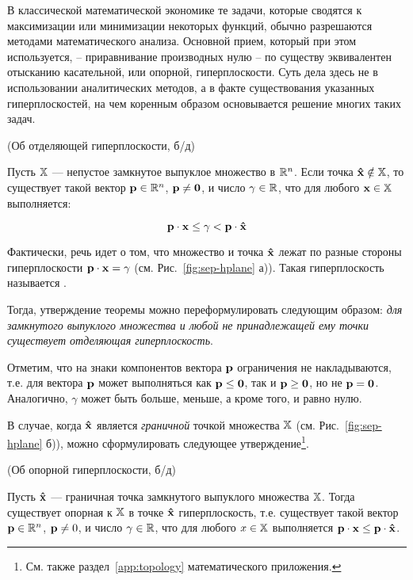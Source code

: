 В классической математической экономике те задачи, которые сводятся
к максимизации или минимизации некоторых функций, обычно разрешаются
методами математического анализа. Основной прием, который при этом
используется, -- приравнивание производных нулю -- по существу
эквивалентен отысканию касательной, или опорной, гиперплоскости.
Суть дела здесь не в использовании аналитических методов, а в факте
существования указанных гиперплоскостей, на чем коренным образом
основывается решение многих таких задач.


\begin{teo}(Об отделяющей гиперплоскости, б/д)
\label{teo:sep-hplane}

Пусть $\mathbb{X}$ --- непустое замкнутое выпуклое множество в $\mathbb{R}^n$.
Если точка $\mathbf{\hat x} \notin \mathbb{X}$, то существует такой вектор
$\mathbf{p} \in \mathbb{R}^n$, $\mathbf{p} \neq \mathbf{0}$, и число $\gamma \in \mathbb{R}$,
что для любого $\mathbf{x} \in \mathbb{X}$ выполняется:

\[\mathbf{p} \cdot \mathbf{x} \leq \gamma < \mathbf{p} \cdot \mathbf{\hat x}\]
\end{teo}

Фактически, речь идет о том, что множество  и точка $\mathbf{\hat x}$
лежат по разные стороны гиперплоскости $\mathbf{p} \cdot \mathbf{x} =
\gamma$ (см. Рис.~\ref{fig:sep-hplane} а)). Такая гиперплоскость
называется .

Тогда, утверждение теоремы можно переформулировать следующим
образом: \emph{для замкнутого выпуклого множества и любой не
принадлежащей ему точки существует отделяющая гиперплоскость}.

\begin{note}

Отметим, что на знаки компонентов вектора $\mathbf{p}$ ограничения не
накладываются, т.е. для вектора $\mathbf{p}$ может выполняться как
$\mathbf{p} \leq \mathbf{0}$, так и $\mathbf{p} \geq \mathbf{0}$, но не $\mathbf{p} =
\mathbf{0}$. Аналогично, $\gamma$ может быть больше, меньше, а кроме
того, и равно нулю.
\end{note}




В случае, когда $\mathbf{\hat x}$ является \emph{граничной} точкой
множества $\mathbb{X}$ (см. Рис.~\ref{fig:sep-hplane} б)), можно
сформулировать следующее утверждение\footnote{См. также
раздел~\vref{app:topology} математического приложения.}.

\begin{teo}(Об опорной гиперплоскости, б/д)

Пусть $\mathbf{\hat x}$  --- граничная точка замкнутого выпуклого
множества $\mathbb{X}$. Тогда существует опорная к $\mathbb{X}$ в точке
$\mathbf{\hat x}$ гиперплоскость, т.е. существует такой вектор $\mathbf{p}
\in \mathbb{R}^n$, $\mathbf{p} \neq 0$, и число $\gamma \in \mathbb{R}$, что для любого
$x \in \mathbb{X}$ выполняется $\mathbf{p} \cdot \mathbf{x} \leq \mathbf{p} \cdot
\mathbf{\hat x}$.
\end{teo}

